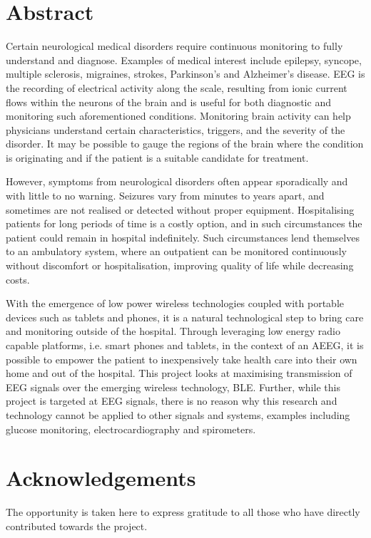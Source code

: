 \documentclass[]{article}
\begin{document}
\clearpage

\section*{Abstract}
Certain neurological medical disorders require continuous monitoring to fully understand and diagnose. Examples of medical interest include epilepsy, syncope, multiple sclerosis, migraines, strokes, Parkinson’s and Alzheimer’s disease. \ac{EEG} is the recording of electrical activity along the scale, resulting from ionic current flows within the neurons of the brain and is useful for both diagnostic and monitoring such aforementioned conditions. Monitoring brain activity can help physicians understand certain characteristics, triggers, and the severity of the disorder. It may be possible to gauge the regions of the brain where the condition is originating and if the patient is a suitable candidate for treatment. 

However, symptoms from neurological disorders often appear sporadically and with little to no warning. Seizures vary from minutes to years apart, and sometimes are not realised or detected without proper equipment. Hospitalising patients for long periods of time is a costly option, and in such circumstances the patient could remain in hospital indefinitely.  Such circumstances lend themselves to an ambulatory system, where an outpatient can be monitored continuously without discomfort or hospitalisation, improving quality of life while decreasing costs. 

With the emergence of low power wireless technologies coupled with portable devices such as tablets and phones, it is a natural technological step to bring care and monitoring outside of the hospital. Through leveraging low energy radio capable platforms, i.e. smart phones and tablets, in the context of an \ac{AEEG}, it is possible to empower the patient to inexpensively take health care into their own home and out of the hospital. This project looks at maximising transmission of \ac{EEG} signals over the emerging wireless technology, \ac{BLE}. Further, while this project is targeted at \ac{EEG} signals, there is no reason why this research and technology cannot be applied to other signals and systems, examples including glucose monitoring, electrocardiography and spirometers.


\clearpage
\tableofcontents
\clearpage

\section{Acknowledgements}
The opportunity is taken here to express gratitude to all those who have directly contributed towards the project. 
\end{document}

